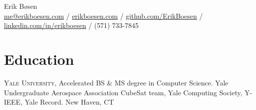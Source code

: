 \documentclass[10pt, a4paper]{article}
\newcommand{\years}[1]{\marginnote{\scriptsize #1}}
\begin{document}
{\LARGE Erik Bøsen}\\
\href{mailto:me@erikboesen.com}{me@erikboesen.com} / \href{https://erikboesen.com}{erikboesen.com} / \href{https://github.com/ErikBoesen}{github.com/ErikBoesen} / \href{https://www.linkedin.com/in/erikboesen}{linkedin.com/in/erikboesen} / (571) 733-7845\\

\section*{Education}
\noindent
\years{2019-2023}\textsc{Yale University}, Accelerated BS \& MS degree in Computer Science. Yale Undergraduate Aerospace Association CubeSat team, Yale Computing Society, Y-IEEE, Yale Record. New Haven, CT\\
\end{document}
